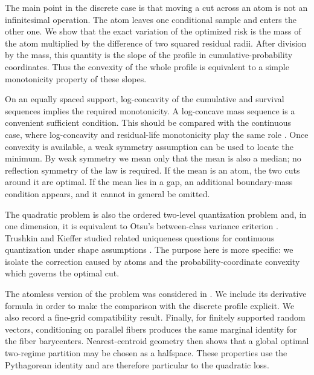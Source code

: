 \documentclass[a4paper]{amsart}
\numberwithin{equation}{section}
\theoremstyle{remark}
\newcommand{\1}{\mathbf 1}
\begin{document}
The main point in the discrete case is that moving a cut across an atom is not
an infinitesimal operation.  The atom leaves one conditional sample and enters
the other one.  We show that the exact variation of the optimized risk is the
mass of the atom multiplied by the difference of two squared residual radii.
After division by the mass, this quantity is the slope of the profile in
cumulative-probability coordinates.  Thus the convexity of the whole profile
is equivalent to a simple monotonicity property of these slopes.

On an equally spaced support, log-concavity of the cumulative and survival
sequences implies the required monotonicity.  A log-concave mass sequence is a
convenient sufficient condition.  This should be compared with the continuous
case, where log-concavity and residual-life monotonicity play the same role
\cite{johnson-goldschmidt,bagnoli-bergstrom}.  Once convexity is available, a
weak symmetry assumption can be used to locate the minimum.  By weak symmetry
we mean only that the mean is also a median; no reflection symmetry of the law
is required.  If the mean is an atom, the two cuts around it are optimal.  If
the mean lies in a gap, an additional boundary-mass condition appears, and it
cannot in general be omitted.

The quadratic problem is also the ordered two-level quantization problem and,
in one dimension, it is equivalent to Otsu's between-class variance criterion
\cite{otsu,fisher-1958,lloyd-1982}.  Trushkin and Kieffer studied related
uniqueness questions for continuous quantization under shape assumptions
\cite{trushkin1982,kieffer1983}.  The purpose here is more specific: we isolate
the correction caused by atoms and the probability-coordinate convexity which
governs the optimal cut.

The atomless version of the problem was considered in
\cite{nistor-popescu-continuous}.  We include its derivative formula in order
to make the comparison with the discrete profile explicit.  We also record a
fine-grid compatibility result.  Finally, for finitely supported random
vectors, conditioning on parallel fibers produces the same marginal identity
for the fiber barycenters.  Nearest-centroid geometry then shows that a global
optimal two-regime partition may be chosen as a halfspace.  These properties
use the Pythagorean identity and are therefore particular to the quadratic
loss.
\end{document}
